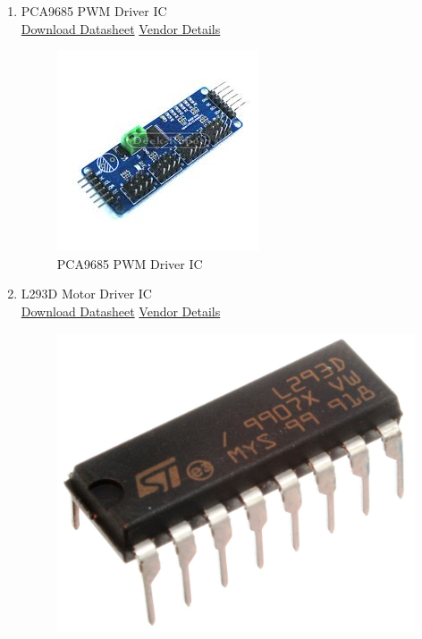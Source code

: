 \documentclass[a4paper,12pt,oneside]{book}
\begin{document}
\begin{itemize}
\begin{enumerate}
      \item PCA9685 PWM Driver IC  \\
      \href{www.cdn-shop.adafruit.com/datasheets/PCA9685.pdf} {Download Datasheet}
      \href{http://www.amazon.in/Channel-Servo-Motor-Driver-Controller-PCA9685/dp/B01D4I8KII?tag=googinhydr18418-21&tag=googinkenshoo-21&ascsubtag=a4459339-54b9-4883-ac3e-2de2611b95a1} {Vendor Details}
      \begin{figure}[H]
        \centering
        \includegraphics[scale=0.6]{PCA9685}
        \caption{PCA9685 PWM Driver IC}
      \end{figure}
      \item L293D Motor Driver IC       \\
      \href{www.ti.com/lit/ds/symlink/l293.pdf} {Download Datasheet}
      \href{http://www.amazon.in/L293D-Push-Pull-Four-Channel-Stepper-Driver/dp/B00MYZPL4Y?tag=googinhydr18418-21&tag=googinkenshoo-21&ascsubtag=a4459339-54b9-4883-ac3e-2de2611b95a1} {Vendor Details}
      \begin{figure}[H]
        \centering
        \includegraphics[scale=0.4]{L293D}

\end{figure}
\end{enumerate}
\end{itemize}
\end{document}
